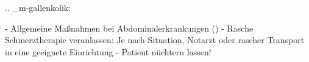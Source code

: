 %

.. _m-gallenkolik:

%
\begin{itemize}
  -   Allgemeine Maßnahmen bei Abdominalerkrankungen
  ()
  -   Rasche Schmerztherapie veranlassen: Je nach
  Situation, Notarzt oder rascher Transport in eine
  geeignete Einrichtung
  -   Patient nüchtern lassen!
\end{itemize}